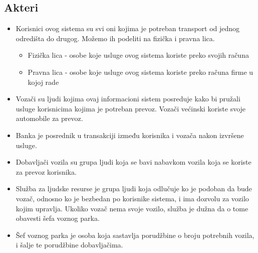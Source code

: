 \subsection{\bfseries Akteri}
\begin{itemize}
    \item Korisnici ovog sistema su svi oni kojima je potreban transport od jednog odredišta do drugog. Možemo ih podeliti na fizička i pravna lica. 
    \begin{itemize}
        \item Fizička lica - osobe koje usluge ovog sistema koriste preko svojih računa
        \item Pravna lica - osobe koje usluge ovog sistema koriste preko računa firme u kojoj rade
    \end{itemize}
    \item Vozači su ljudi kojima ovaj informacioni sistem posreduje kako bi pružali usluge korisnicima kojima je potreban prevoz. Vozači većinski koriste svoje automobile za prevoz.
    \item Banka je posrednik u transakciji između korisnika i vozača nakon izvršene usluge.
    \item Dobavljači vozila su grupa ljudi koja se bavi nabavkom vozila koja se koriste za prevoz korisnika.
    \item Služba za ljudske resurse je grupa ljudi koja odlučuje ko je podoban da bude vozač, odnosno ko je bezbedan po korisnike sistema, i ima dozvolu za vozilo kojim upravlja. Ukoliko vozač nema svoje vozilo, služba je dužna da o tome obavesti šefa voznog parka.
     \item Šef voznog parka je osoba koja sastavlja porudžbine o broju potrebnih vozila, i šalje te porudžbine dobavljačima.
\end{itemize}